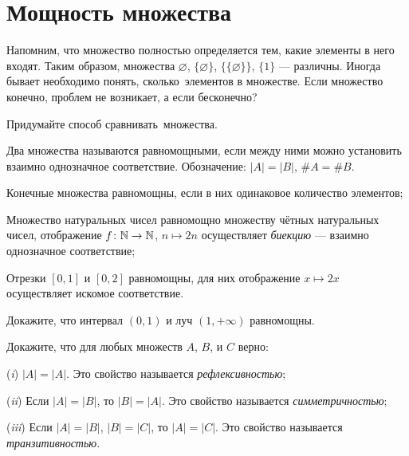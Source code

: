 \documentclass[a4paper,12pt]{article}
\begin{document}

\vspace*{-1.5cm}
\section*{Мощность множества}


Напомним, что множество  полностью определяется тем, какие элементы в него входят.
Таким образом, множества $\varnothing$, $\{\varnothing\}$, $\{\{\varnothing\}\}$, $\{1\}$ --- различны.
Иногда бывает необходимо понять,  сколько\ элементов в множестве. Если множество конечно, проблем не возникает, а если бесконечно?

Придумайте способ  сравнивать\ множества.

Два множества называются  равномощными, если между ними можно установить взаимно однозначное соответствие. Обозначение: $|A|=|B|$, $\#A=\#B$.

Конечные множества равномощны, если в них одинаковое количество элементов;

Множество натуральных чисел равномощно множеству чётных натуральных чисел, отображение $f\colon \mathbb{N} \rightarrow \mathbb{N}$, $n \mapsto 2n$ осуществляет \emph{биекцию} --- взаимно однозначное соответствие;

Отрезки $[0,1]$ и $[0,2]$ равномощны, для них отображение $x \mapsto 2x$ осуществляет искомое соответствие.


Докажите, что интервал $(0,1)$ и луч $(1,+\infty)$ равномощны.



Докажите, что для любых множеств $A$, $B$, и $C$ верно:

({\it{i\/}}) $|A| = |A|$. Это свойство называется \emph{рефлексивностью};

({\it{ii\/}}) Если $|A| = |B|$, то $|B|=|A|$. Это свойство называется \emph{симметричностью};

({\it{iii\/}}) Если $|A| = |B|$, $|B|=|C|$, то $|A|=|C|$. Это свойство называется \emph{транзитивностью}.
\end{document}

